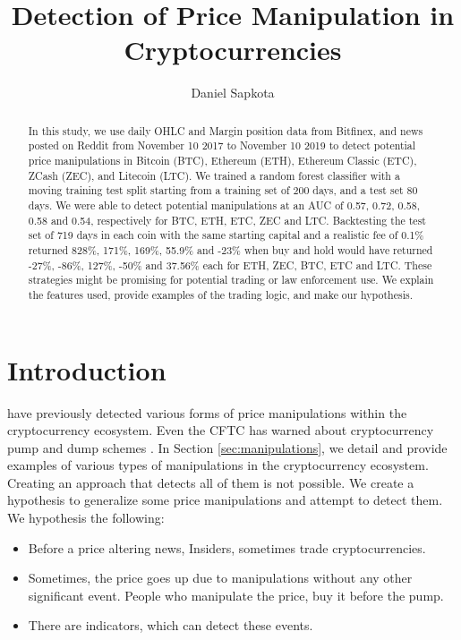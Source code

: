 \documentclass[letterpaper]{article}
\title{Detection of Price Manipulation in Cryptocurrencies}
\author{Daniel Sapkota}
\begin{document}
\maketitle

\begin{abstract}
    In this study, we use daily 
    OHLC and Margin position data from Bitfinex, and news posted on Reddit from November 10 2017
    to November 10 2019 to detect potential price manipulations in Bitcoin (BTC), Ethereum (ETH), 
    Ethereum Classic (ETC), ZCash (ZEC), and Litecoin (LTC). 
    We trained a random forest classifier 
    with a moving training test split starting from a training set of 200 days, and a test set 80 days. 
    We were able to detect potential manipulations at an AUC of 0.57, 0.72, 0.58, 0.58 and 0.54, respectively for BTC, ETH, ETC,
    ZEC and LTC.
    Backtesting the test set of 719 days in each coin
    with the same starting capital and a realistic fee of 0.1\% returned 
    828\%, 171\%, 169\%, 55.9\% and -23\% when buy and hold would have returned 
    -27\%, -86\%, 127\%, -50\% and 37.56\% each for ETH, ZEC, BTC, ETC and LTC.
     These strategies might be promising 
    for potential trading or law enforcement use. We explain the features used, 
    provide examples of the trading logic, and make our hypothesis.
\end{abstract}

\section{Introduction}
\label{sec:introduction}
\cite{griffin2019bitcoin,mirtaheri2019identifying,xu2019anatomy,gandal2018price,feder2018impact,li2019cryptocurrency}
have previously detected various forms of price manipulations within the cryptocurrency ecosystem.  
Even the CFTC has warned about cryptocurrency pump and dump schemes \cite{cftc_2018}. 
In Section \ref{sec:manipulations}, we detail and provide examples of various types of manipulations in the 
cryptocurrency ecosystem. Creating an approach that detects all of them is not possible. We create a
 hypothesis to generalize some price manipulations and attempt to detect them. We hypothesis the 
following:

\begin{itemize}
    \item Before a price altering news, Insiders, sometimes trade cryptocurrencies.
    \item Sometimes, the price goes up due to manipulations without any other significant event. 
    People who manipulate the price, buy it before the pump. 
    \item There are indicators, which can detect these events.
\end{itemize}
\end{document}
